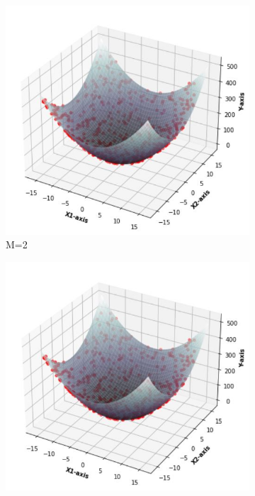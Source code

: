 \documentclass[11pt]{article}
\begin{document}
\begin{figure}[h]
\centering
	\begin{subfigure}[b]{0.4\textwidth}
	\centering
	\includegraphics[scale=0.5]{dataset2_500_lambda0_m2funcplot.jpg}
	\caption{    M=2}
	\label{fig:fig2.1.3.1}
	\end{subfigure}
	\hfill
	\begin{subfigure}[b]{0.4\textwidth}
	\centering
	\includegraphics[scale=0.5]{dataset2_500_lambda0_m3funcplot.jpg}

\end{subfigure}
\end{figure}
\end{document}
